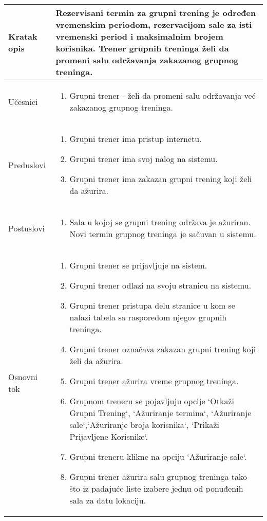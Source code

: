 \documentclass[../grupniTreninzi.tex]{subfiles}
\begin{document}
\begin{longtable}{| p{} | p{} |} 
\hline
    Kratak opis & Rezervisani termin za grupni trening je određen vremenskim periodom, rezervacijom sale za isti vremenski period i maksimalnim brojem korisnika. Trener grupnih treninga želi da promeni salu održavanja zakazanog grupnog treninga.\\ 
\hline    
    Učesnici &
    \begin{enumerate}
        \item Grupni trener - želi da promeni salu održavanja već zakazanog grupnog treninga.
    \end{enumerate}\\
\hline
   Preduslovi & 
   \begin{enumerate}
        \item Grupni trener ima pristup internetu.
        \item Grupni trener ima svoj nalog na sistemu.
        \item Grupni trener ima zakazan grupni trening koji želi da ažurira.
    \end{enumerate}\\
\hline  
    Postuslovi &
    \begin{enumerate}
        \item Sala u kojoj se grupni trening održava je ažuriran. Novi termin grupnog treninga je sačuvan u sistemu.
    \end{enumerate}\\
\hline
    Osnovni tok & 
    \begin{enumerate}
        \item Grupni trener se prijavljuje na sistem.
        \item Grupni trener odlazi na svoju stranicu na sistemu.
        \item Grupni trener pristupa delu stranice u kom se nalazi tabela sa rasporedom njegov grupnih treninga.
        \item Grupni trener označava zakazan grupni trening koji želi da ažurira.
        \item Grupni trener ažurira vreme grupnog treninga.
        \item Grupnom treneru se pojavljuju opcije `Otkaži Grupni Trening`, `Ažuriranje termina`, `Ažuriranje sale`,`Ažuriranje broja korisnika`, `Prikaži Prijavljene Korisnike`.
        \item Grupni treneru klikne na opciju `Ažuriranje sale`. 
        \item Grupni trener ažurira salu grupnog treninga tako što iz padajuće liste izabere jednu od ponuđenih sala za datu lokaciju.

\end{enumerate}
\end{longtable}
\end{document}
